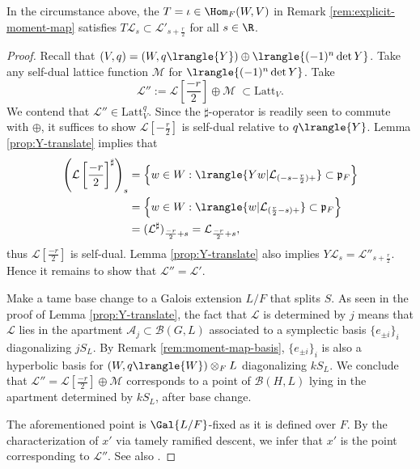 \documentclass[a4paper,10pt]{article}
\begin{document}
\begin{proposition}\label{prop:T-depth}
	In the circumstance above, the $T = \iota \in \Hom_F(W, V)$ in Remark \ref{rem:explicit-moment-map} satisfies $T\mathcal{L}_s \subset \mathcal{L}'_{s + \frac{r}{2}}$ for all $s \in \R$.
\end{proposition}
\begin{proof}
	Recall that $(V,q) = (W, q\lrangle{Y}) \oplus \lrangle{(-1)^n \det Y}$. Take any self-dual lattice function $\mathcal{M}$ for $\lrangle{(-1)^n \det Y}$. Take
	\[ \mathcal{L}'' := \mathcal{L}\left[ \frac{-r}{2} \right] \oplus \mathcal{M} \; \subset \text{Latt}_V. \]
	We contend that $\mathcal{L}'' \in \text{Latt}_V^q$. Since the $\sharp$-operator is readily seen to commute with $\oplus$, it suffices to show $\mathcal{L}[-\frac{r}{2}]$ is self-dual relative to $q\lrangle{Y}$. Lemma \ref{prop:Y-translate} implies that
	\begin{align*}
		\left( \mathcal{L}\left[ \frac{-r}{2} \right]^\sharp\right)_s & = \left\{ w \in W : \lrangle{Yw | \mathcal{L}_{(-s - \frac{r}{2})+}} \subset \mathfrak{p}_F \right\} \\
		& = \left\{ w \in W : \lrangle{w | \mathcal{L}_{( \frac{r}{2} - s )+} } \subset \mathfrak{p}_F \right\} \\
		& = (\mathcal{L}^\sharp)_{\frac{-r}{2} + s} = \mathcal{L}_{ \frac{-r}{2} + s},
	\end{align*}
	thus $\mathcal{L}[\frac{-r}{2}]$ is self-dual. Lemma \ref{prop:Y-translate} also implies $Y\mathcal{L}_s = \mathcal{L}''_{s + \frac{r}{2}}$. Hence it remains to show that $\mathcal{L}'' = \mathcal{L}'$.
	
	Make a tame base change to a Galois extension $L/F$ that splits $S$. As seen in the proof of Lemma \ref{prop:Y-translate}, the fact that $\mathcal{L}$ is determined by $j$ means that $\mathcal{L}$ lies in the apartment $\mathcal{A}_j \subset \mathcal{B}(G, L)$ associated to a symplectic basis $\{e_{\pm i}\}_i$ diagonalizing $jS_L$. By Remark \ref{rem:moment-map-basis}, $\{e_{\pm i}\}_i$ is also a hyperbolic basis for $(W, q\lrangle{W}) \otimes_F L$ diagonalizing $kS_L$. We conclude that $\mathcal{L}'' = \mathcal{L}[\frac{-r}{2}] \oplus \mathcal{M}$ corresponds to a point of $\mathcal{B}(H, L)$ lying in the apartment determined by $kS_L$, after base change.

	The aforementioned point is $\Gal{L/F}$-fixed as it is defined over $F$. By the characterization \cite{Pra01} of $x'$ via tamely ramified descent, we infer that $x'$ is the point corresponding to $\mathcal{L}''$. See also \cite[\S 5.1]{LMS16}.
\end{proof}
\end{document}
